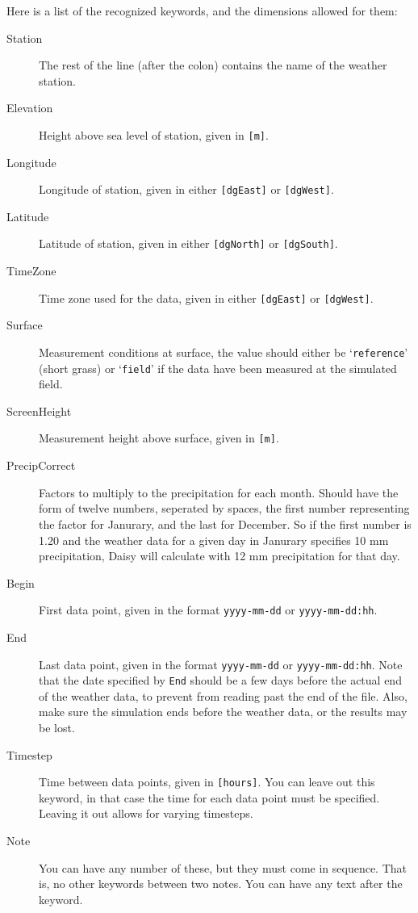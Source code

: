 Here is a list of the recognized keywords, and the dimensions allowed
for them:
\begin{description}
\item[Station] The rest of the line (after the colon) contains the
  name of the weather station.
\item[Elevation] Height above sea level of station, given in
  \texttt{[m]}. 
\item[Longitude] Longitude of station, given in either \texttt{[dgEast]} or
  \texttt{[dgWest]}. 
\item[Latitude] Latitude of station, given in either \texttt{[dgNorth]} or
  \texttt{[dgSouth]}.
\item[TimeZone] Time zone used for the data, given in either
  \texttt{[dgEast]} or \texttt{[dgWest]}.
\item[Surface] Measurement conditions at surface, the value should
  either be `\texttt{reference}' (short grass) or `\texttt{field}' if
  the data have been measured at the simulated field.  
\item[ScreenHeight] Measurement height above surface, given in
  \texttt{[m]}. 
\item[PrecipCorrect] Factors to multiply to the precipitation for each
  month.  Should have the form of twelve numbers, seperated by spaces,
  the first number representing the factor for Janurary, and the last
  for December.  So if the first number is 1.20 and the weather data
  for a given day in Janurary specifies 10 mm precipitation, Daisy
  will calculate with 12 mm precipitation for that day.
\item[Begin] First data point, given in the format
  \texttt{yyyy-mm-dd} or \texttt{yyyy-mm-dd:hh}.
\item[End] Last data point, given in the format \texttt{yyyy-mm-dd} or
  \texttt{yyyy-mm-dd:hh}.  Note that the date specified by
  \texttt{End} should be a few days before the actual end of the
  weather data, to prevent \daisy{} from reading past the end of the
  file.  Also, make sure the simulation ends before the weather data,
  or the results may be lost.
\item[Timestep] Time between data points, given in \texttt{[hours]}.
  You can leave out this keyword, in that case the time for each data
  point must be specified.  Leaving it out allows for varying
  timesteps. 
\item[Note] You can have any number of these, but they must come in
  sequence.  That is, no other keywords between two notes.  You can
  have any text after the keyword. 

\end{description}
